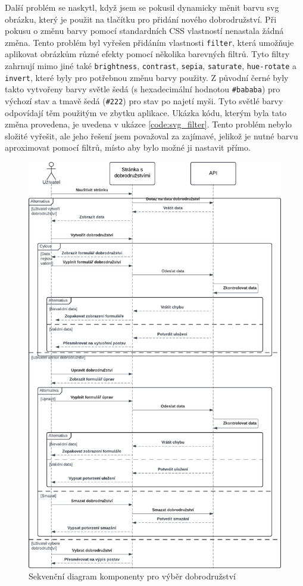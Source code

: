 Další problém se naskytl, když jsem se pokusil dynamicky měnit barvu svg obrázku, který je použit na tlačítku pro přidání nového dobrodružství. Při pokusu o změnu barvy pomocí standardních CSS vlastností nenastala žádná změna. Tento problém byl vyřešen přidáním vlastnosti \texttt{filter}, která umožňuje aplikovat obrázkům různé efekty pomocí několika barevných filtrů. Tyto filtry zahrnují mimo jiné také \texttt{brightness}, \texttt{contrast}, \texttt{sepia}, \texttt{saturate}, \texttt{hue-rotate} a \texttt{invert}, které byly pro potřebnou změnu barvy použity. Z původní černé byly takto vytvořeny barvy světle šedá (s hexadecimální hodnotou \texttt{\#bababa}) pro výchozí stav a tmavě šedá (\texttt{\#222}) pro stav po najetí myši. Tyto světlé barvy odpovídají těm použitým ve zbytku aplikace. Ukázka kódu, kterým byla tato změna provedena, je uvedena v ukázce \ref{code:svg_filter}. Tento problém nebylo složité vyřešit, ale jeho řešení jsem považoval za zajímavé, jelikož je nutné barvu aproximovat pomocí filtrů, místo aby bylo možné ji nastavit přímo.

\begin{figure}[htbp]
  \centering
  \includegraphics[width=.80\textwidth]{resources/figures/adventure_diagram.pdf}
  \caption{Sekvenční diagram komponenty pro výběr dobrodružství}
  \label{fig:adventure_diagram}
\end{figure}

